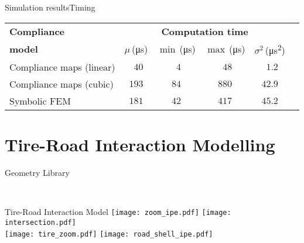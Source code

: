 \begin{frame}{Simulation results}{Timing}
  \begin{center}
  \begin{table}[ht]
    \centering
    \begin{tabular}{p{}ccccc}
      \toprule
      \textbf{Compliance} & \multicolumn{4}{c}{\textbf{Computation time}} \\ \cmidrule(l{5pt}r{5pt}){2-5}
      \textbf{model} & $\mu$\,(\si{\micro\second}) & $\min$\,(\si{\micro\second}) & $\max$\,(\si{\micro\second}) & $\sigma^2$\,(\si{\micro\second\squared}) \\
      \midrule
      Compliance maps (linear) & $\phantom{0}40$ & $\phantom{0}4$ & $\phantom{0}48$ & $\phantom{0}1.2$ \\
      Compliance maps (cubic)  & $193$           & $84$           & $880$           & $42.9$ \\
      Symbolic FEM             & $181$           & $42$           & $417$           & $45.2$ \\
      \bottomrule
    \end{tabular}
  \end{table}
\end{center}
\end{frame}

\section{Tire-Road Interaction Modelling}

\begin{frame}{Geometry Library}
  \vspace{-1.0em}%
  \centering%
  \begin{minipage}[c]{0.45\textwidth}%
    \centering\def\svgwidth{6.5cm}%
    \small{} \\
    \def\svgwidth{6.5cm}%
    \small{}
  \end{minipage}%
  \hfill%
  \begin{minipage}[c]{0.45\textwidth}%
    \centering\def\svgwidth{6.5cm}%
    \small{}
  \end{minipage}%
\end{frame}

\begin{frame}{Tire-Road Interaction Model}
  \vspace{-1.0em}
  \centering
  \texttt{[image: zoom\_ipe.pdf]}%
  \texttt{[image: intersection.pdf]} \\
  \texttt{[image: tire\_zoom.pdf]}%
  \texttt{[image: road\_shell\_ipe.pdf]}
\end{frame}

